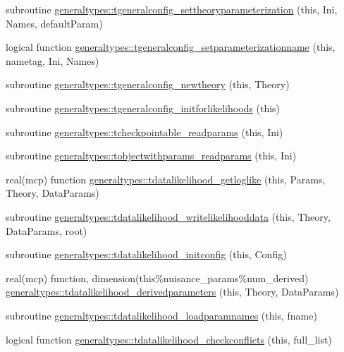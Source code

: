 \begin{DoxyCompactItemize}
\item 
subroutine \mbox{\hyperlink{namespacegeneraltypes_a9ebf4d67be70717d4385bd575cc2300f}{generaltypes\+::tgeneralconfig\+\_\+settheoryparameterization}} (this, Ini, Names, default\+Param)
\item 
logical function \mbox{\hyperlink{namespacegeneraltypes_a86a26412494e782acd18ef23abfc46b4}{generaltypes\+::tgeneralconfig\+\_\+setparameterizationname}} (this, nametag, Ini, Names)
\item 
subroutine \mbox{\hyperlink{namespacegeneraltypes_a510e50b9adaf980266f3c8160135f409}{generaltypes\+::tgeneralconfig\+\_\+newtheory}} (this, Theory)
\item 
subroutine \mbox{\hyperlink{namespacegeneraltypes_ad67421d900a21e6dc1a5d34ea7bc77fe}{generaltypes\+::tgeneralconfig\+\_\+initforlikelihoods}} (this)
\item 
subroutine \mbox{\hyperlink{namespacegeneraltypes_ad37138d6b09c9e6feda0357b1c94e85a}{generaltypes\+::tcheckpointable\+\_\+readparams}} (this, Ini)
\item 
subroutine \mbox{\hyperlink{namespacegeneraltypes_aebd5d13abc4092b06e3e6164880ee11a}{generaltypes\+::tobjectwithparams\+\_\+readparams}} (this, Ini)
\item 
real(mcp) function \mbox{\hyperlink{namespacegeneraltypes_a44032002cc7bece9f328a839b5830b5d}{generaltypes\+::tdatalikelihood\+\_\+getloglike}} (this, Params, Theory, Data\+Params)
\item 
subroutine \mbox{\hyperlink{namespacegeneraltypes_a077299298ffed6e9dea751a27ca45507}{generaltypes\+::tdatalikelihood\+\_\+writelikelihooddata}} (this, Theory, Data\+Params, root)
\item 
subroutine \mbox{\hyperlink{namespacegeneraltypes_abae245dbb211bd2f44ed4267e47206de}{generaltypes\+::tdatalikelihood\+\_\+initconfig}} (this, Config)
\item 
real(mcp) function, dimension(this\%nuisance\+\_\+params\%num\+\_\+derived) \mbox{\hyperlink{namespacegeneraltypes_a6bb9fb37002b4265a3a4f438c4b045fa}{generaltypes\+::tdatalikelihood\+\_\+derivedparameters}} (this, Theory, Data\+Params)
\item 
subroutine \mbox{\hyperlink{namespacegeneraltypes_aaea05ea7158416ca57ed2178bdac9431}{generaltypes\+::tdatalikelihood\+\_\+loadparamnames}} (this, fname)
\item 
logical function \mbox{\hyperlink{namespacegeneraltypes_a07c63d132f04e331ccb42e8f96080129}{generaltypes\+::tdatalikelihood\+\_\+checkconflicts}} (this, full\+\_\+list)
\item 

\end{DoxyCompactItemize}
